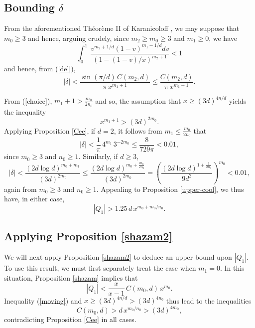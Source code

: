 \subsection{Bounding $\delta$}

From the aforementioned Th\'eor\`eme II of Karanicoloff \cite{Ka}, we may suppose that $m_0 \geq 3$ and hence, arguing crudely, since $m_2 \geq m_0 \geq 3$ and $m_1 \geq 0$, we have
$$
 \int^{1}_{0} ~
\frac{v^{m_2+1/d} (1-v)^{m_1-1/d} dv}{(1-(1-v)/x)^{m_2+1}} < 1
$$
and hence, from (\ref{del}), 
\begin{equation} \label{frog}
|\delta| < \frac{\sin (\pi/d) \, C(m_2,d)}{\pi \,  x^{m_1+1}} \leq \frac{C(m_2,d)}{\pi \,  x^{m_1+1}}.
\end{equation}
 
From (\ref{choice}),  $m_1+1 > \frac{m_0}{2 n_0}$ and so, the  assumption that $x \geq (3d)^{4n/d}$ yields the inequality 
$$
x^{m_1+1} >  (3d)^{2 m_0}. 
$$
Applying Proposition \ref{Cee}, if $d=2$, it follows from $m_1 \leq \frac{m_0}{2n_0}$ that 
$$
|\delta| <  \frac{1}{\pi} \, 4^{m_1} \, 3^{-2m_0} \leq \frac{8}{729 \pi} < 0.01,
$$
since $m_0 \geq 3$ and $n_0 \geq 1$.
Similarly, if $d \geq 3$, 
$$
|\delta| <  \frac{(2 d \log d)^{m_0+m_1}}{(3d)^{2m_0}} \leq \frac{(2 d \log d)^{m_0+\frac{m_0}{2n_0}}}{(3d)^{2m_0}}
= \left( \frac{(2 d \log d)^{1+\frac{1}{2n_0}}}{9d^{2}} \right)^{m_0} < 0.01,
$$
again from $m_0 \geq 3$ and $n_0 \geq 1$.
Appealing to Proposition \ref{upper-cool}, we thus have, in either case,
\begin{equation} \label{moving}
 |Q_1| > 1.25 \, d \, x^{m_0+m_0/n_0}.
\end{equation}


\subsection{Applying Proposition \ref{shazam2}}

We will next apply Proposition \ref{shazam2} to deduce an upper bound upon $|Q_1|$. To use this result, we must first separately treat the case when $m_1=0$. In this situation, 
Proposition \ref{shazam} implies that
$$
|Q_1| < \frac{x}{x-1}   \, C(m_0,d) \, x^{m_0}.
$$
Inequality (\ref{moving}) and $x \geq (3d)^{4n/d} > (3d)^{4n_0}$ thus lead to the inequalities 
$$
C(m_0,d) > d \, x^{m_0/n_0} > (3d)^{4 m_0},
$$
contradicting Proposition \ref{Cee} in all cases.

